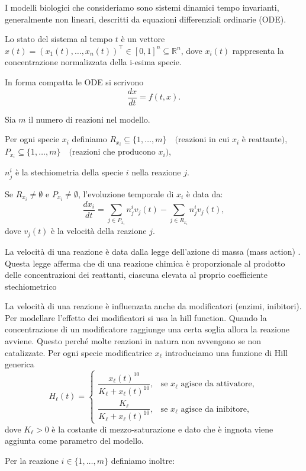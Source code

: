I modelli biologici che consideriamo sono sistemi dinamici tempo invarianti, generalmente non lineari, descritti da equazioni differenziali ordinarie (ODE).

Lo stato del sistema al tempo \(t\) è un vettore \(x(t) = (x_1(t),\dots,x_n(t))^\top \in [0,1]^n \subseteq \mathbb{R}^n\), dove \(x_i(t)\) rappresenta la concentrazione normalizzata della i-esima specie.

In forma compatta le ODE si scrivono
\[
\frac{dx}{dt} = f(t,x).
\]

Sia \(m\) il numero di reazioni nel modello.

Per ogni specie \(x_i\) definiamo
$R_{x_i} \subseteq \{1,\dots,m\}\quad\text{(reazioni in cui \(x_i\) è reattante)}$,
$P_{x_i} \subseteq \{1,\dots,m\}\quad\text{(reazioni che producono \(x_i\))}$, 

$n^i_j$ è la stechiometria della specie $i$ nella reazione $j$.

Se \(R_{x_i}\neq\emptyset\) e \(P_{x_i}\neq\emptyset\), l'evoluzione temporale di \(x_i\) è data da:
\[
\frac{dx_i}{dt}=\sum_{j\in P_{x_i}} n^i_j v_j(t) - \sum_{j\in R_{x_i}} n_j^i v_j(t),
\]
dove \(v_j(t)\) è la velocità della reazione \(j\).

La velocità di una reazione è data dalla legge dell'azione di massa (mass action) \cite{klipp2009systems}.
Questa legge afferma che di una reazione chimica è proporzionale al prodotto delle concentrazioni dei reattanti, ciascuna elevata al proprio coefficiente stechiometrico

La velocità di una reazione è influenzata anche da modificatori (enzimi, inibitori). Per modellare l'effetto dei modificatori si usa la hill function. Quando la concentrazione di un modificatore raggiunge una certa soglia allora la reazione avviene.
Questo perché molte reazioni in natura non avvengono se non catalizzate.
Per ogni specie modificatrice \(x_\ell\) introduciamo una funzione di Hill generica
\[
H_\ell(t) =
\begin{cases}
\dfrac{x_\ell(t)^{10}}{K_\ell + x_\ell(t)^{10}}, &\text{se \(x_\ell\) agisce da attivatore},\\[8pt]
\dfrac{K_\ell}{K_\ell + x_\ell(t)^{10}}, &\text{se \(x_\ell\) agisce da inibitore},
\end{cases}
\]
dove \(K_\ell>0\) è la costante di mezzo-saturazione e dato che è ingnota viene aggiunta come parametro del modello.

Per la reazione \(i\in\{1,\dots,m\}\) definiamo inoltre:


